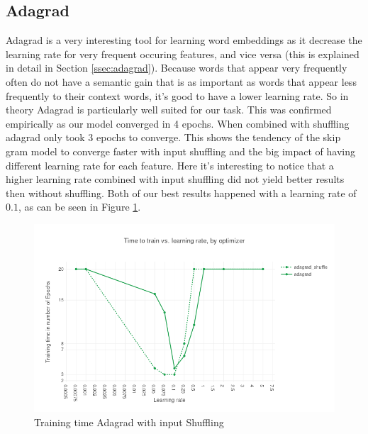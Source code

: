 \subsection{Adagrad}
Adagrad \cite{adagrad} is a very interesting tool for learning word embeddings as it decrease the learning rate for very frequent occuring features, and vice versa (this is explained in detail in Section \ref{ssec:adagrad}). Because words that appear very frequently often do not have a semantic gain that is as important as words that appear less frequently  to their context words, it's good to have a lower learning rate. So in theory Adagrad is particularly well suited for our task. This was confirmed empirically as our model converged in 4 epochs. When combined with shuffling adagrad only took 3 epochs to converge. This shows the tendency of the skip gram model to converge faster with input shuffling and the big impact of having different learning rate for each feature. 
Here it's interesting to notice that a higher learning rate combined with input shuffling did not yield better results then without shuffling. Both of our best results happened with a learning rate of $0.1$, as can be seen in Figure \ref{fig:results_adagrad_shuffle}.
\begin{figure}[h]
    \centering
			\includegraphics[scale=0.45]{images/results_adagrad_shuffle} 
    \caption{Training time Adagrad with input Shuffling}
    \label{fig:results_adagrad_shuffle}
\end{figure}
